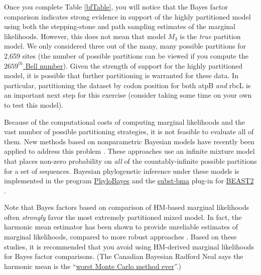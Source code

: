 \documentclass[11pt]{article}
\begin{document}
Once you complete Table \ref{bfTable}, you will notice that the Bayes factor comparison indicates strong evidence in support of the highly partitioned model using both the stepping-stone and path sampling estimates of the marginal likelihoods. 
However, this does not mean that model $M_3$ is the \textit{true} partition model.
We only considered three out of the many, many possible partitions for 2,659 sites (the number of possible partitions can be viewed if you compute the \href{http://www.wolframalpha.com/input/?i=bell+number(2659)}{$2659^{th}$ Bell number}). 
Given the strength of support for the highly partitioned model, it is possible that further partitioning is warranted for these data. 
In particular, partitioning the dataset by codon position for both atpB \textit{and} rbcL is an important next step for this exercise (consider taking some time on your own to test this model). 

Because of the computational costs of computing marginal likelihoods and the vast number of possible partitioning strategies, it is not feasible to evaluate all of them. 
New methods based on nonparametric Bayesian models have recently been applied to address this problem \citep{lartillot04,huelsenbeck07b,wuCH2013}. 
These approaches use an infinite mixture model \citep[the Dirichlet process;][]{ferguson73,antoniak74} that places non-zero probability on \textit{all} of the countably-infinite possible partitions for a set of sequences. 
Bayesian phylogenetic inference under these models is implemented in the program \href{http://megasun.bch.umontreal.ca/People/lartillot/www/index.htm}{PhyloBayes} \citep{Lartillot2009} and the \href{https://code.google.com/p/subst-bma/}{subst-bma} plug-in for \href{http://beast2.cs.auckland.ac.nz/index.php/Main_Page}{BEAST2} \citep{wuCH2013}.




Note that Bayes factors based on comparison of HM-based marginal likelihoods 
often \textit{strongly} favor the most extremely partitioned mixed model. 
In fact, the harmonic mean estimator has been shown to provide unreliable estimates of marginal likelihoods, compared to more robust approaches \citep{lartillot06,xie11,fan11}.
Based on these studies, it is recommended that you avoid %
using HM-derived marginal likelihoods for Bayes factor comparisons.
(The Canadian Bayesian Radford Neal says the harmonic mean is the ``\href{http://radfordneal.wordpress.com/2008/08/17/the-harmonic-mean-of-the-likelihood-worst-monte-carlo-method-ever/}{worst Monte Carlo method ever}''.)
\end{document}
